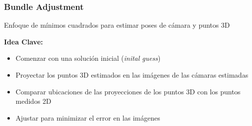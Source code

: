 \begin{frame}
    \frametitle{Bundle Adjustment}
    
    Enfoque de mínimos cuadrados para estimar poses de cámara y puntos 3D
    
    \textbf{Idea Clave:}
    \begin{itemize}
        \item Comenzar con una solución inicial (\emph{inital guess})
        \item Proyectar los puntos 3D estimados en las imágenes de las cámaras estimadas
        \item Comparar ubicaciones de las proyecciones de los puntos 3D con los puntos medidos 2D
        \item Ajustar para minimizar el error en las imágenes
    \end{itemize}
    
\end{frame}


